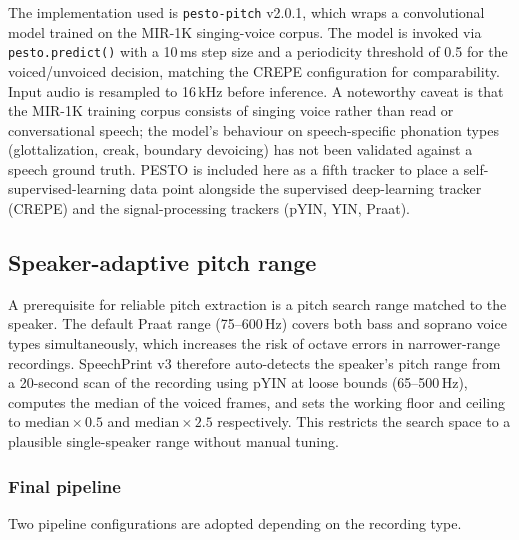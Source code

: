 \begin{enumerate}
      The implementation used is \texttt{pesto-pitch} v2.0.1, which wraps a
      convolutional model trained on the MIR-1K singing-voice corpus. The model
      is invoked via \texttt{pesto.predict()} with a 10\,ms step size and a
      periodicity threshold of 0.5 for the voiced/unvoiced decision, matching the
      CREPE configuration for comparability. Input audio is resampled to 16\,kHz
      before inference. A noteworthy caveat is that the MIR-1K training corpus
      consists of singing voice rather than read or conversational speech; the
      model's behaviour on speech-specific phonation types (glottalization,
      creak, boundary devoicing) has not been validated against a speech ground
      truth. PESTO is included here as a fifth tracker to place a
      self-supervised-learning data point alongside the supervised deep-learning
      tracker (CREPE) and the signal-processing trackers (pYIN, YIN, Praat).

\end{enumerate}

\subsection{Speaker-adaptive pitch range}

A prerequisite for reliable pitch extraction is a pitch search range matched to
the speaker. The default Praat range (75--600\,Hz) covers both bass and soprano
voice types simultaneously, which increases the risk of octave errors in
narrower-range recordings. SpeechPrint v3 therefore auto-detects the speaker's
pitch range from a 20-second scan of the recording using pYIN at loose bounds
(65--500\,Hz), computes the median of the voiced frames, and sets the working
floor and ceiling to $\text{median} \times 0.5$ and $\text{median} \times 2.5$
respectively. This restricts the search space to a plausible single-speaker range
without manual tuning.

\subsubsection{Final pipeline}

Two pipeline configurations are adopted depending on the recording type.


